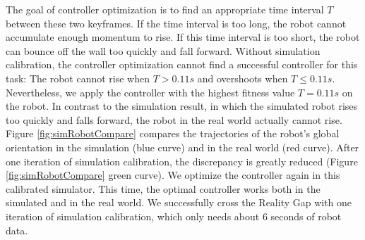 The goal of controller optimization is to find an appropriate time interval $T$ between these two keyframes. If the time interval is too long, the robot cannot accumulate enough momentum to rise. If this time interval is too short, the robot can bounce off the wall too quickly and fall forward. Without simulation calibration, the controller optimization cannot find a successful controller for this task: The robot cannot rise when $T > 0.11s$ and overshoots when $T \leq 0.11s$. Nevertheless, we apply the controller with the highest fitness value $T=0.11s$ on the robot. In contrast to the simulation result, in which the simulated robot rises too quickly and falls forward, the robot in the real world actually cannot rise. Figure \ref{fig:simRobotCompare} compares the trajectories of the robot's global orientation in the simulation (blue curve) and in the real world (red curve). After one iteration of simulation calibration, the discrepancy is greatly reduced (Figure \ref{fig:simRobotCompare} green curve). We optimize the controller again in this calibrated simulator. This time, the optimal controller works both in the simulated and in the real world. We successfully cross the Reality Gap with one iteration of simulation calibration, which only needs about 6 seconds of robot data.



